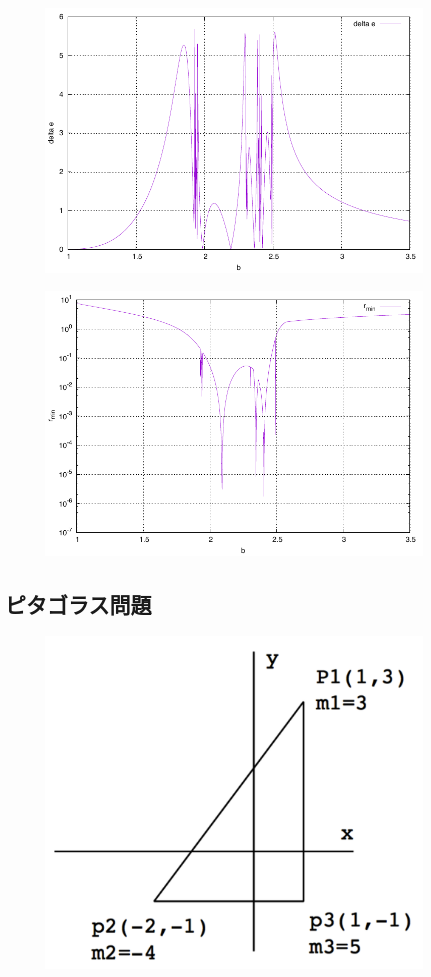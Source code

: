 \documentclass[11pt,a4paper,oneside,onecolumn]{jarticle}
\begin{document}
\begin{figure}[H]
\centering
\includegraphics[width=10cm]{./image/protoplanet_delta_e.pdf}
\caption{\label{}}
\end{figure}

\begin{figure}[H]
\centering
\includegraphics[width=10cm]{./image/protoplanet_r_min.pdf}
\caption{\label{}}
\end{figure}

\subsection{ピタゴラス問題}

\begin{figure}[H]
\centering
\includegraphics[width=10cm]{./image/pythagoras_1.pdf}
\caption{\label{}}
\end{figure}
\end{document}
